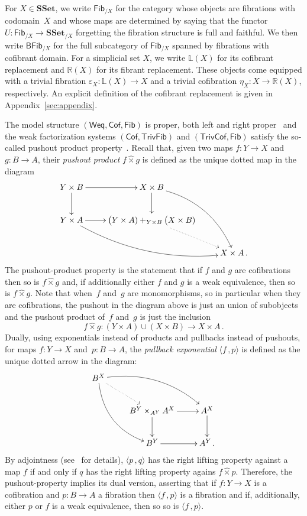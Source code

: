 \documentclass[reqno,10pt,a4paper,oneside,draft]{amsart}
\numberwithin{equation}{section}
\theoremstyle{mythm}
\theoremstyle{mydef}
\theoremstyle{myrmk}
\newcommand{\ie}{\text{i.e.\ }}
\newcommand{\myemph}{\textit}
\newcommand{\co}{\colon}
\newcommand{\SSet}{\mathbf{SSet}}
\newcommand{\Weq}{\mathsf{Weq}}
\newcommand{\hattimes}{\mathbin{\hat{\times}}}
\newcommand{\Cof}{\mathsf{Cof}}
\newcommand{\TrivFib}{\mathsf{TrivFib}}
\newcommand{\Fib}{\mathsf{Fib}}
\newcommand{\TrivCof}{\mathsf{TrivCof}}
\newcommand{\BFFib}{\mathsf{BFib}}
\begin{document}
For $X \in \SSet$, we write $\Fib_{/X}$ for the category whose objects are fibrations with codomain~$X$ 
and whose maps are determined by saying that the functor $U \co \Fib_{/X} \to \SSet_{/X}$ forgetting the
fibration structure is  full and faithful. We then write $\BFFib_{/X}$ for the full subcategory of $\Fib_{/X}$  spanned by fibrations with cofibrant domain. For a simplicial set $X$, we write $\mathbb{L}(X)$ for its cofibrant replacement and $\mathbb{R}(X)$ for its
fibrant replacement. These objects come equipped with a trivial fibration $\varepsilon_X \co \mathbb{L}(X) \to X$ and a trivial cofibration $\eta_X \co 
X \to \mathbb{R}(X)$, respectively. An explicit definition of the cofibrant replacement is given 
in Appendix~\ref{sec:appendix}.

\medskip

The model structure $(\Weq, \Cof, \Fib)$ is proper, \ie both left and right proper~\cite[Propositions 2.2.9 and 3.5.2]{henry2019qms}
and the weak factorization systems $(\Cof, \TrivFib)$ and $(\TrivCof, \Fib)$
satisfy the so-called pushout product property~\cite[Proposition 5.1.5 and Corollary 5.2.3]{henry2018wms}. Recall that, given two maps $f \co Y \rightarrow X$ and $g \co B \rightarrow A$, their \emph{pushout product} $f \hattimes g$ is defined as the unique dotted map in the diagram
\[
\xymatrix{
Y \times B \ar[r] \ar[d] &  X \times B \ar[d] \ar@/^1.5pc/[ddr] \\
Y \times A \ar[r]  \ar@/_1.5pc/[drr] & \displaystyle \big( Y \times A ) +_{Y \times B} \big( X \times B ) \ar@{.>}[dr]  \\
 & & X \times A \, . }
 \]
The pushout-product property is  the statement that  if $f$ and $g$ are cofibrations then so is $f \hattimes g$
and, if additionally either $f$ and $g$ is a weak equivalence, then so is $f \hattimes g$.
Note that when~$f$ and~$g$ are monomorphisms, so in particular when they are cofibrations, the pushout in the diagram above is just an union of subobjects and the pushout product of~$f$ and~$g$ is just the inclusion
\[  
f \hattimes g \co (Y \times A) \cup (X \times B) \rightarrow X \times A \, .
\]
Dually, using  exponentials instead of products and pullbacks instead of pushouts, for maps $f \co Y \rightarrow X$ and~$p \co B \rightarrow A$, the \myemph{pullback exponential}  $\langle f \, , p \rangle$ is defined as the unique dotted arrow in the diagram:
\[
\xymatrix{
 B^X \ar@{.>}[dr] \ar@/^1.5pc/[drr] \ar@/_1.5pc/[ddr] \\
& B^Y \times_{A^Y} A^X \ar[r] \ar[d] &  A^X \ar[d]  \\
& B^Y \ar[r] & A^Y  \, . \\
 }
 \]
By adjointness (see~\cite{joyal-tierney-segal} for details), $\langle p \, , q \rangle $ has the right lifting property against a map $f$  if and only if $q$ has the right lifting property agains $f \hattimes p$.
Therefore, the pushout-property  implies its dual version, asserting that  if $f \co Y \to X$ is a cofibration and $p \co B \to A$ a fibration then $\langle f \, , p \rangle$ is a fibration and if, additionally,  either $p$ or $f$ is a weak equivalence, then so so is $\langle f \, , p \rangle$.
\end{document}
